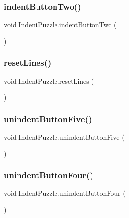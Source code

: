 \subsubsection{\texorpdfstring{indent\+Button\+Two()}{indentButtonTwo()}}
{\footnotesize\ttfamily void Indent\+Puzzle.\+indent\+Button\+Two (\begin{DoxyParamCaption}{ }\end{DoxyParamCaption})}

\mbox{\label{class_indent_puzzle_a415f779d82c83fb96cde45421a684f43}} 
\subsubsection{\texorpdfstring{reset\+Lines()}{resetLines()}}
{\footnotesize\ttfamily void Indent\+Puzzle.\+reset\+Lines (\begin{DoxyParamCaption}{ }\end{DoxyParamCaption})}

\mbox{\label{class_indent_puzzle_a4aabfa2cd19fadbb5d2e13d4e6defa1d}} 
\subsubsection{\texorpdfstring{unindent\+Button\+Five()}{unindentButtonFive()}}
{\footnotesize\ttfamily void Indent\+Puzzle.\+unindent\+Button\+Five (\begin{DoxyParamCaption}{ }\end{DoxyParamCaption})}

\mbox{\label{class_indent_puzzle_a3a68645b408c0649e237fa77c79ffa15}} 
\subsubsection{\texorpdfstring{unindent\+Button\+Four()}{unindentButtonFour()}}
{\footnotesize\ttfamily void Indent\+Puzzle.\+unindent\+Button\+Four (\begin{DoxyParamCaption}{ }\end{DoxyParamCaption})}

